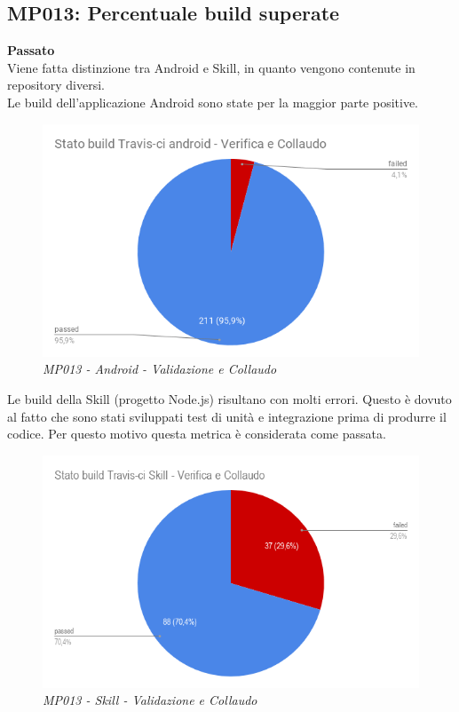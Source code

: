 \subsection{MP013: Percentuale build superate}
\textbf{Passato}\\
Viene fatta distinzione tra Android e Skill, in quanto vengono contenute in repository diversi.\\
Le build dell'applicazione Android sono state per la maggior parte positive. \\
\begin{figure} [H]
    \centering
	\includegraphics[scale=0.4]{./images/RA_buildapp.png}
    \caption{\textit{MP013 - Android - Validazione e Collaudo}}\label{}
\end{figure}
Le build della Skill (progetto Node.js) risultano con molti errori. Questo è dovuto al fatto che sono stati sviluppati test di unità e integrazione prima di produrre il codice. Per questo motivo questa metrica è considerata come passata.\\
\begin{figure} [H]
    \centering
	\includegraphics[scale=0.4]{./images/RA_buildskill.png}
    \caption{\textit{MP013 - Skill - Validazione e Collaudo}}\label{}
\end{figure}

